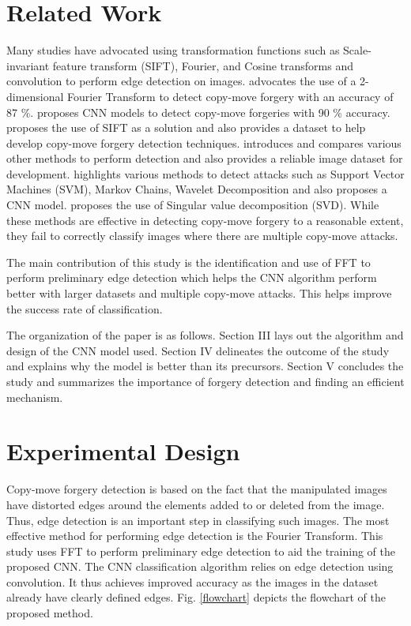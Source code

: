 \documentclass[conference]{IEEEtran}
\begin{document}
\section{Related Work}
Many studies have advocated using transformation functions such as Scale-invariant feature transform (SIFT), Fourier, and Cosine transforms \cite{b1} and convolution to perform edge detection on images. \cite{b2} advocates the use of a 2-dimensional Fourier Transform to detect copy-move forgery with an accuracy of 87 \%. \cite{b3} proposes CNN models to detect copy-move forgeries with 90 \% accuracy. \cite{b4} proposes the use of SIFT as a solution and also provides a dataset to help develop copy-move forgery detection techniques. \cite{b5} introduces and compares various other methods to perform detection and also provides a reliable image dataset for development. \cite{b6} highlights various methods to detect attacks such as Support Vector Machines (SVM), Markov Chains, Wavelet Decomposition and also proposes a CNN model. \cite{b8} proposes the use of Singular value decomposition (SVD). While these methods are effective in detecting copy-move forgery to a reasonable extent, they fail to correctly classify images where there are multiple copy-move attacks.

The main contribution of this study is the identification and use of FFT to perform preliminary edge detection which helps the CNN algorithm perform better with larger datasets and multiple copy-move attacks. This helps improve the success rate of classification.

The organization of the paper is as follows. Section III lays out the algorithm and design of the CNN model used. Section IV delineates the outcome of the study and explains why the model is better than its precursors. Section V concludes the study and summarizes the importance of forgery detection and finding an efficient mechanism.

\section{Experimental Design}
Copy-move forgery detection is based on the fact that the manipulated images have distorted edges around the elements added to or deleted from the image. Thus, edge detection is an important step in classifying such images. The most effective method for performing edge detection is the Fourier Transform. This study uses FFT to perform preliminary edge detection to aid the training of the proposed CNN. The CNN classification algorithm relies on edge detection using convolution. It thus achieves improved accuracy as the images in the dataset already have clearly defined edges. Fig. \ref{flowchart} depicts the flowchart of the proposed method.
\end{document}
